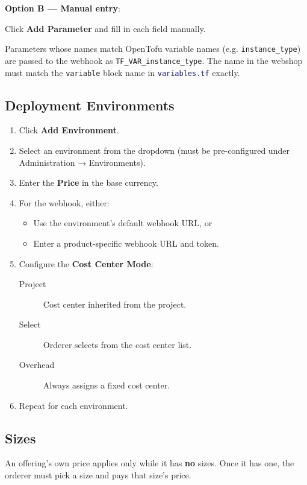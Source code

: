 \documentclass[12pt,a4paper,twoside]{report}
\newcommand{\notebox}[1]{\begin{tcolorbox}[noteboxstyle]#1\end{tcolorbox}}
\newcommand{\code}[1]{\texttt{#1}}
\newcommand{\file}[1]{\texttt{\textcolor{MidnightBlue}{#1}}}
\begin{document}
\textbf{Option B — Manual entry}:

Click \textbf{Add Parameter} and fill in each field manually.

\notebox{Parameters whose names match OpenTofu variable names
(e.g. \code{instance\_type}) are passed to the webhook as
\code{TF\_VAR\_instance\_type}. The name in the webshop must match
the \code{variable} block name in \file{variables.tf} exactly.}

\subsection{Deployment Environments}

\begin{enumerate}
  \item Click \textbf{Add Environment}.
  \item Select an environment from the dropdown (must be pre-configured
        under Administration → Environments).
  \item Enter the \textbf{Price} in the base currency.
  \item For the webhook, either:
        \begin{itemize}
          \item Use the environment's default webhook URL, or
          \item Enter a product-specific webhook URL and token.
        \end{itemize}
  \item Configure the \textbf{Cost Center Mode}:
        \begin{description}
          \item[Project] Cost center inherited from the project.
          \item[Select] Orderer selects from the cost center list.
          \item[Overhead] Always assigns a fixed cost center.
        \end{description}
  \item Repeat for each environment.
\end{enumerate}

\subsection{Sizes}

An offering's own price applies only while it has \textbf{no} sizes. Once it
has one, the orderer must pick a size and pays that size's price.
\end{document}
